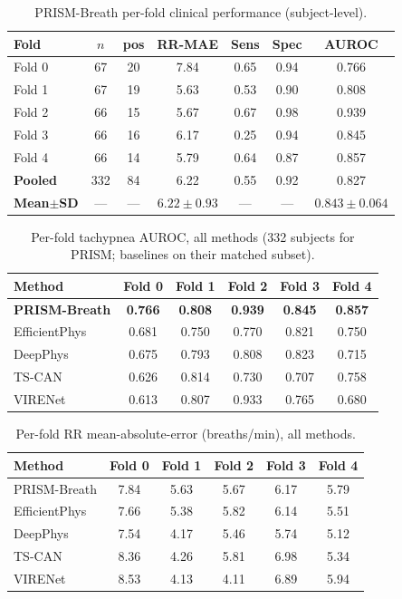 
\begin{table}[!t]
\caption{PRISM-Breath per-fold clinical performance (subject-level).}
\label{tab:s1}\centering\small
\setlength{\tabcolsep}{4pt}
\begin{tabular}{@{}lcccccc@{}}\toprule
Fold & $n$ & pos & RR-MAE & Sens & Spec & AUROC\\\midrule
Fold 0 & 67 & 20 & 7.84 & 0.65 & 0.94 & 0.766 \\
Fold 1 & 67 & 19 & 5.63 & 0.53 & 0.90 & 0.808 \\
Fold 2 & 66 & 15 & 5.67 & 0.67 & 0.98 & 0.939 \\
Fold 3 & 66 & 16 & 6.17 & 0.25 & 0.94 & 0.845 \\
Fold 4 & 66 & 14 & 5.79 & 0.64 & 0.87 & 0.857 \\
\midrule
\textbf{Pooled} & 332 & 84 & 6.22 & 0.55 & 0.92 & 0.827 \\
\textbf{Mean$\pm$SD} & --- & --- & $6.22{\pm}0.93$ & --- & --- & $0.843{\pm}0.064$ \\
\bottomrule
\end{tabular}
\end{table}

\begin{table}[!t]
\caption{Per-fold tachypnea AUROC, all methods (332 subjects for PRISM; baselines on their matched subset).}
\label{tab:s2}\centering\small
\begin{tabular}{@{}lccccc@{}}\toprule
Method & Fold 0 & Fold 1 & Fold 2 & Fold 3 & Fold 4\\\midrule
\textbf{PRISM-Breath} & \textbf{0.766} & \textbf{0.808} & \textbf{0.939} & \textbf{0.845} & \textbf{0.857} \\
EfficientPhys & 0.681 & 0.750 & 0.770 & 0.821 & 0.750 \\
DeepPhys & 0.675 & 0.793 & 0.808 & 0.823 & 0.715 \\
TS-CAN & 0.626 & 0.814 & 0.730 & 0.707 & 0.758 \\
VIRENet & 0.613 & 0.807 & 0.933 & 0.765 & 0.680 \\
\bottomrule
\end{tabular}
\end{table}

\begin{table}[!t]
\caption{Per-fold RR mean-absolute-error (breaths/min), all methods.}
\label{tab:s3}\centering\small
\begin{tabular}{@{}lccccc@{}}\toprule
Method & Fold 0 & Fold 1 & Fold 2 & Fold 3 & Fold 4\\\midrule
PRISM-Breath & 7.84 & 5.63 & 5.67 & 6.17 & 5.79 \\
EfficientPhys & 7.66 & 5.38 & 5.82 & 6.14 & 5.51 \\
DeepPhys & 7.54 & 4.17 & 5.46 & 5.74 & 5.12 \\
TS-CAN & 8.36 & 4.26 & 5.81 & 6.98 & 5.34 \\
VIRENet & 8.53 & 4.13 & 4.11 & 6.89 & 5.94 \\
\bottomrule
\end{tabular}
\end{table}